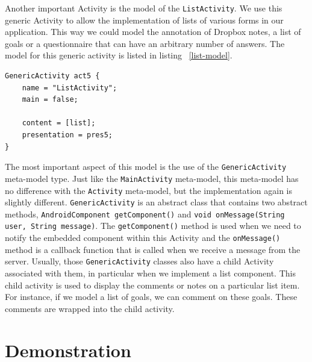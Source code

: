 Another important Activity is the model of the \texttt{ListActivity}. We use this generic Activity to allow the implementation of lists of various forms in our application. This way we could model the annotation of Dropbox notes, a list of goals or a questionnaire that can have an arbitrary number of answers. The model for this generic activity is listed in listing ~\ref{list-model}.
\begin{lstlisting}[label=list-model,caption=ListActivity model, captionpos=t]
GenericActivity act5 {
	name = "ListActivity";
	main = false;

	content = [list];
	presentation = pres5;
}
\end{lstlisting}
The most important aspect of this model is the use of the \texttt{GenericActivity} meta-model type. Just like the \texttt{MainActivity} meta-model, this meta-model has no difference with the \texttt{Activity} meta-model, but the implementation again is slightly different. \texttt{GenericActivity} is an abstract class that contains two abstract methods, \texttt{AndroidComponent getComponent()} and \texttt{void onMessage(String user, String message)}. The \texttt{getComponent()} method is used when we need to notify the embedded component within this Activity and the \texttt{onMessage()} method is a callback function that is called when we receive a message from the server. Usually, those \texttt{GenericActivity} classes also have a child Activity associated with them, in particular when we implement a list component. This child activity is used to display the comments or notes on a particular list item. For instance, if we model a list of goals, we can comment on these goals. These comments are wrapped into the child activity.

\section{Demonstration}

